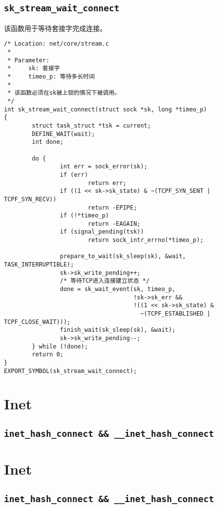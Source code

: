 \subsection{\texttt{sk_stream_wait_connect}}
该函数用于等待套接字完成连接。
\begin{verbatim}
/* Location: net/core/stream.c
 *
 * Parameter:
 *     sk: 套接字
 *     timeo_p: 等待多长时间
 *
 * 该函数必须在sk被上锁的情况下被调用。
 */
int sk_stream_wait_connect(struct sock *sk, long *timeo_p)
{
        struct task_struct *tsk = current;
        DEFINE_WAIT(wait);
        int done;

        do {
                int err = sock_error(sk);
                if (err)
                        return err;
                if ((1 << sk->sk_state) & ~(TCPF_SYN_SENT | TCPF_SYN_RECV))
                        return -EPIPE;
                if (!*timeo_p)
                        return -EAGAIN;
                if (signal_pending(tsk))
                        return sock_intr_errno(*timeo_p);

                prepare_to_wait(sk_sleep(sk), &wait, TASK_INTERRUPTIBLE);
                sk->sk_write_pending++;
                /* 等待TCP进入连接建立状态 */
                done = sk_wait_event(sk, timeo_p,
                                     !sk->sk_err &&
                                     !((1 << sk->sk_state) &
                                       ~(TCPF_ESTABLISHED | TCPF_CLOSE_WAIT)));
                finish_wait(sk_sleep(sk), &wait);
                sk->sk_write_pending--;
        } while (!done);
        return 0;
}
EXPORT_SYMBOL(sk_stream_wait_connect);
\end{verbatim}

\section{Inet}
    \subsection{\texttt{inet_hash_connect && __inet_hash_connect}}

    \section{Inet}
        \subsection{\texttt{inet_hash_connect && __inet_hash_connect}}


